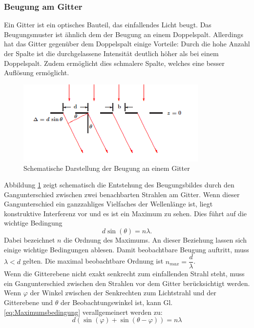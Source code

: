 \documentclass[12pt,a4paper]{article}
\begin{document}
\subsubsection{Beugung am Gitter}
Ein Gitter ist ein optisches Bauteil, das einfallendes Licht beugt. Das Beugungsmuster ist ähnlich dem der Beugung an einem Doppelspalt. Allerdings hat das Gitter gegenüber dem Doppelspalt einige Vorteile: Durch die hohe Anzahl der Spalte ist die durchgelassene Intensität deutlich höher als bei einem Doppelspalt. Zudem ermöglicht dies schmalere Spalte, welches eine besser Auflösung ermöglicht.\\
	\begin{figure}
		\begin{center}
			\includegraphics[scale=1.2]{Bilder/Gitterbeugung_Schema.PNG}
		\end{center}
		\caption[Gitterbeugung Schema]{Schematische Darstellung der Beugung an einem Gitter}
		\label{fig:Gitterbeugung_Schema}
	\end{figure}
	Abbildung \ref{fig:Gitterbeugung_Schema} zeigt schematisch die Entstehung des Beugungsbildes durch den Gangunterschied zwischen zwei benachbarten Strahlen am Gitter. Wenn dieser Gangunterschied ein ganzzahliges Vielfaches der Wellenlänge ist, liegt konstruktive Interferenz vor und es ist ein Maximum zu sehen. Dies führt auf die wichtige Bedingung
	\begin{equation}
	d \sin (\theta) = n \lambda.
	\label{eq:Maximumsbedingung}
	\end{equation}
	Dabei bezeichnet $n$ die Ordnung des Maximums. An dieser Beziehung lassen sich einige wichtige Bedingungen ablesen. Damit beobachtbare Beugung auftritt, muss $\lambda < d$ gelten. Die maximal beobachtbare Ordnung ist $n_{max} = \dfrac{d}{\lambda}$. \\
	Wenn die Gitterebene nicht exakt senkrecht zum einfallenden Strahl steht, muss ein Gangunterschied zwischen den Strahlen vor dem Gitter berücksichtigt werden. Wenn $\varphi$ der Winkel zwischen der Senkrechten zum Lichtstrahl und der Gitterebene und $\theta$ der Beobachtungswinkel ist, kann Gl. \ref{eq:Maximumsbedingung} verallgemeinert werden zu:
	\begin{equation}
	d(\sin(\varphi) + \sin(\theta - \varphi)) = n \lambda
	\label{eq:VerallgemeinerteMaximumsbedingung}
	\end{equation}
	
\end{document}
